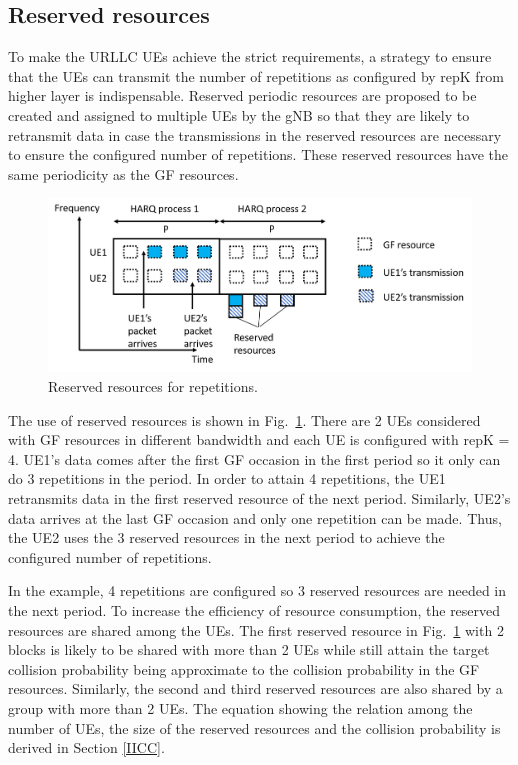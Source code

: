 \documentclass[conference]{IEEEtran}
\begin{document}
\subsection{Reserved resources}\label{IIAA}
To make the URLLC UEs achieve the strict requirements, a strategy to ensure that the UEs can transmit the number of repetitions as configured by repK from higher layer is indispensable. Reserved periodic resources are proposed to be created and assigned to multiple UEs by the gNB so that they are likely to retransmit data in case the transmissions in the reserved resources are necessary to ensure the configured number of repetitions. These reserved resources have the same periodicity as the GF resources.

\begin{figure}[htbp]
\centerline{\includegraphics[scale=0.30]{fig2.png}}
\caption{Reserved resources for repetitions.}
\label{fig2}
\vspace{-2mm}
\end{figure}

The use of reserved resources is shown in Fig.~\ref{fig2}. There are 2 UEs considered with GF resources in different bandwidth and each UE is configured with repK = 4. UE1's data comes after the first GF occasion in the first period so it only can do 3 repetitions in the period. In order to attain 4 repetitions, the UE1 retransmits data in the first reserved resource of the next period. Similarly, UE2's data arrives at the last GF occasion and only one repetition can be made. Thus, the UE2 uses the 3 reserved resources in the next period to achieve the configured number of repetitions.

In the example, 4 repetitions are configured so 3 reserved resources are needed in the next period. To increase the efficiency of resource consumption, the reserved resources are shared among the UEs. The first reserved resource in Fig.~\ref{fig2} with 2 blocks is likely to be shared with more than 2 UEs while still attain the target collision probability being approximate to the collision probability in the GF resources. Similarly, the second and third reserved resources are also shared by a group with more than 2 UEs. The equation showing the relation among the number of UEs, the size of the reserved resources and the collision probability is derived in Section \ref{IICC}.
\end{document}
